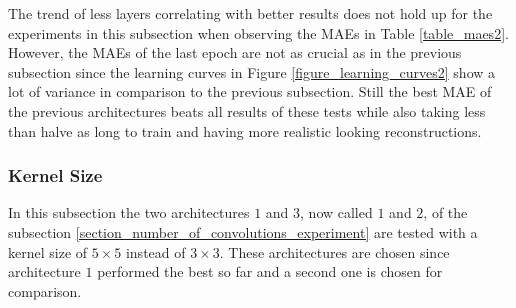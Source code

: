 The trend of less layers correlating with better results does not hold up for the experiments in this subsection when
observing the MAEs in Table \ref{table_maes2}. However, the MAEs of the last epoch are not as crucial as in the 
previous subsection since the learning curves in Figure \ref{figure_learning_curves2} show a lot of variance in 
comparison to the previous subsection. Still the best MAE of the previous architectures beats all results of 
these tests while also taking less than halve as long to train and having more realistic looking reconstructions.


\subsubsection{Kernel Size}

In this subsection the two architectures $1$ and $3$, now called $1$ and $2$,
of the subsection \ref{section_number_of_convolutions_experiment}
are tested with a kernel size of $5\times 5$ instead of $3\times 3$. These architectures are chosen since architecture
$1$ performed the best so far and a second one is chosen for comparison. 


